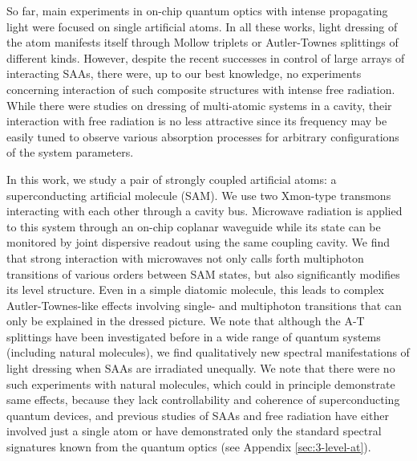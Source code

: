 \documentclass[%
 pra,
 amsmath,amssymb,
 reprint,%
]{revtex4-1}
\begin{document}
So far, main experiments in on-chip quantum 
optics with intense propagating light were 
focused on single artificial 
atoms\cite{baur2009measurement, 
sillanpaa2009autler, astafiev2010resonance, 
novikov2013autler, suri2013observation, 
koshino2013observation, 
braumuller2015multiphoton, peng2018vacuum, 
gasparinetti2019two}. In all these works, light 
dressing of the atom manifests itself through 
Mollow triplets or Autler-Townes splittings of 
different kinds. However, despite the recent 
successes in control of large arrays of 
interacting SAAs\cite{Song574, ye2019propagation, 
arute2019quantum}, there were, up to our best 
knowledge, no experiments concerning interaction 
of such composite structures with intense free 
radiation. While there were studies on dressing 
of multi-atomic systems in a 
cavity\cite{fink2009dressed, 
macha2014implementation, shulga2017observation, 
yang2018probing}, their interaction with free 
radiation is no less attractive since its 
frequency may be easily tuned to observe various 
absorption processes for arbitrary configurations 
of the system parameters.

In this work, we study a pair of strongly coupled 
artificial atoms: a superconducting artificial 
molecule\cite{kou2017fluxonium} (SAM). We use two 
Xmon-type\cite{barends2013coherent} 
transmons\cite{koch2007charge} interacting with 
each other through a cavity 
bus\cite{majer2007coupling}. Microwave radiation 
is applied to this system through an on-chip 
coplanar waveguide while its state can be 
monitored by joint dispersive readout using the 
same coupling cavity\cite{chow2010detecting}. We 
find that strong interaction with microwaves not 
only calls forth multiphoton transitions of 
various orders between SAM states, but also 
significantly modifies its level structure. Even 
in a simple diatomic molecule, this leads to 
complex Autler-Townes-like effects involving 
single- and multiphoton  transitions that can 
only be explained in the dressed picture. We note 
that although the A-T splittings have been 
investigated before in a wide range of quantum 
systems (including natural 
molecules\cite{tamarat1995pump, 
ahmed2012autler}), we find qualitatively new 
spectral manifestations of light dressing when 
SAAs are irradiated unequally. We note that there 
were no such experiments with natural molecules, 
which could in principle demonstrate same 
effects, because they lack controllability and 
coherence of superconducting quantum devices, and 
previous studies of SAAs and free radiation have 
either involved just a single atom or have 
demonstrated only the standard spectral 
signatures known from the quantum optics (see 
Appendix \ref{sec:3-level-at}). 
\end{document}
